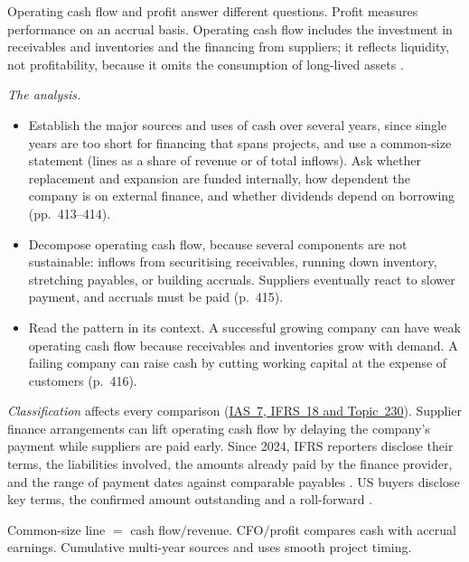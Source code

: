 \begin{qfmethod}\label{meth:cash-flow-interpretation}
 Operating cash flow and profit answer different questions. Profit measures performance on an accrual basis. Operating cash flow includes the investment in receivables and inventories and the financing from suppliers; it reflects liquidity, not profitability, because it omits the consumption of long-lived assets \citep[pp.~411--413]{financial-statement-analysis-2009}.

\emph{The analysis.}
\begin{itemize}
\item Establish the major sources and uses of cash over several years, since single years are too short for financing that spans projects, and use a common-size statement (lines as a share of revenue or of total inflows). Ask whether replacement and expansion are funded internally, how dependent the company is on external finance, and whether dividends depend on borrowing (pp.~413--414).
\item Decompose operating cash flow, because several components are not sustainable: inflows from securitising receivables, running down inventory, stretching payables, or building accruals. Suppliers eventually react to slower payment, and accruals must be paid (p.~415).
\item Read the pattern in its context. A successful growing company can have weak operating cash flow because receivables and inventories grow with demand. A failing company can raise cash by cutting working capital at the expense of customers (p.~416).
\end{itemize}

\emph{Classification} affects every comparison (\hyperref[meth:statement-linked-cash-flows]{IAS~7, IFRS~18 and Topic~230}). Supplier finance arrangements can lift operating cash flow by delaying the company's payment while suppliers are paid early. Since 2024, IFRS reporters disclose their terms, the liabilities involved, the amounts already paid by the finance provider, and the range of payment dates against comparable payables \citep[Annex, IAS~7 paras.~44F--44H and~62]{eu-2024-1317-supplier-finance}. US buyers disclose key terms, the confirmed amount outstanding and a roll-forward \citep[pp.~1--2]{us-supplier-finance-2022}.

 Common-size line $=$ cash flow$/$revenue. CFO$/$profit compares cash with accrual earnings. Cumulative multi-year sources and uses smooth project timing.


\end{qfmethod}
